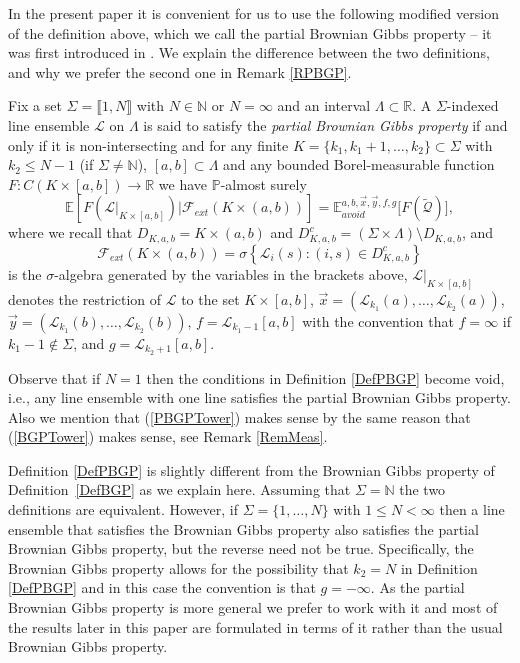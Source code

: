 In the present paper it is convenient for us to use the following modified version of the definition above, which we call the partial Brownian Gibbs property -- it was first introduced in \cite{DimMat}. We explain the difference between the two definitions, and why we prefer the second one in Remark \ref{RPBGP}.
\begin{definition}\label{DefPBGP}
Fix a set $\Sigma = \llbracket 1 , N \rrbracket$ with $N \in \mathbb{N}$ or $N  = \infty$ and an interval $\Lambda \subset \mathbb{R}$.  A $\Sigma$-indexed line ensemble $\mathcal{L}$ on $\Lambda$ is said to satisfy the {\em partial Brownian Gibbs property} if and only if it is non-intersecting and for any finite $K = \{k_1, k_1 + 1, \dots, k_2 \} \subset \Sigma$ with $k_2 \leq N - 1$ (if $\Sigma \neq \mathbb{N}$), $[a,b] \subset \Lambda$ and any bounded Borel-measurable function $F: C(K \times [a,b]) \rightarrow \mathbb{R}$ we have $\mathbb{P}$-almost surely
\begin{equation}\label{PBGPTower}
\mathbb{E} \left[ F(\mathcal{L}|_{K \times [a,b]}) {\big \vert} \mathcal{F}_{ext} (K \times (a,b))  \right] =\mathbb{E}_{avoid}^{a,b, \vec{x}, \vec{y}, f, g} \bigl[ F(\tilde{\mathcal{Q}}) \bigr],
\end{equation}
where we recall that $D_{K,a,b} = K \times (a,b)$ and $D_{K,a,b}^c = (\Sigma \times \Lambda) \setminus D_{K,a,b}$, and
$$\mathcal{F}_{ext} (K \times (a,b)) = \sigma \left \{ \mathcal{L}_i(s): (i,s) \in D_{K,a,b}^c \right\}$$
is the $\sigma$-algebra generated by the variables in the brackets above, $ \mathcal{L}|_{K \times [a,b]}$ denotes the restriction of $\mathcal{L}$ to the set $K \times [a,b]$, $\vec{x} = (\mathcal{L}_{k_1}(a), \dots, \mathcal{L}_{k_2}(a))$, $\vec{y} = (\mathcal{L}_{k_1}(b), \dots, \mathcal{L}_{k_2}(b))$, $f = \mathcal{L}_{k_1 - 1}[a,b]$ with the convention that $f = \infty$ if $k_1 - 1 \not \in \Sigma$, and $g = \mathcal{L}_{k_2 +1}[a,b]$.
\end{definition}
\begin{remark} \label{BGPDeg}
Observe that if $N = 1$ then the conditions in Definition \ref{DefPBGP} become void, i.e., any line ensemble with one line satisfies the partial Brownian Gibbs property. Also we mention that (\ref{PBGPTower}) makes sense by the same reason that (\ref{BGPTower}) makes sense, see Remark \ref{RemMeas}.
\end{remark}
\begin{remark}\label{RPBGP}
Definition \ref{DefPBGP} is slightly different from the Brownian Gibbs property of Definition~\ref{DefBGP} as we explain here. Assuming that $\Sigma = \mathbb{N}$ the two definitions are equivalent. However, if $\Sigma = \{1, \dots, N\}$ with $1 \leq N < \infty$ then a line ensemble that satisfies the Brownian Gibbs property also satisfies the partial Brownian Gibbs property, but the reverse need not be true. Specifically, the Brownian Gibbs property allows for the possibility that $k_2 = N$ in Definition \ref{DefPBGP} and in this case the convention is that $g = -\infty$. As the partial Brownian Gibbs property is more general we prefer to work with it and most of the results later in this paper are formulated in terms of it rather than the usual Brownian Gibbs property.
\end{remark}


